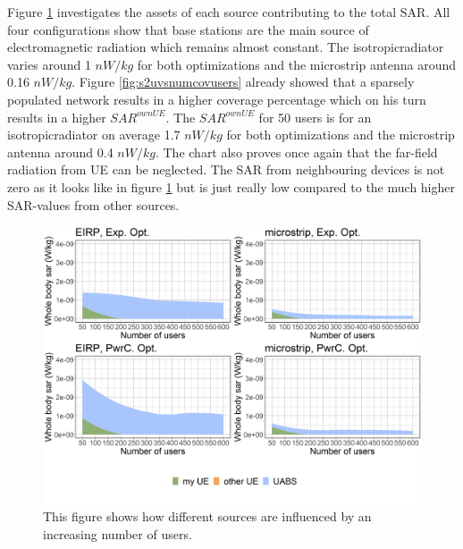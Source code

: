 Figure \ref{fig:s2fourSourcesMatrix} investigates the assets of each source contributing to the total \gls{SAR}. All four 
configurations show that base stations are the main source of electromagnetic radiation which remains almost constant.
The \gls{isotropicradiator} varies around 1 $nW/kg$ for both optimizations and the microstrip antenna around 0.16 $nW/kg$.
Figure \ref{fig:s2uvsnumcovusers} already 
showed that a sparsely populated network results in a higher coverage percentage which on his turn results in a higher $SAR^{ownUE}$. 
The  $SAR^{ownUE}$ for 50 users is for an \gls{isotropicradiator} on average 1.7 $nW/kg$ for both optimizations and the microstrip antenna around 0.4 $nW/kg$.
The chart also proves once again that the far-field radiation from \gls{UE} can be neglected. The \gls{SAR} from 
neighbouring devices is not zero as it looks like in figure \ref{fig:s2fourSourcesMatrix} but is just really low compared to the much higher
\gls{SAR}-values from other sources.
\begin{figure}[h!]
\centering
  \includegraphics[width=\textwidth]{../results/s2/uFourSources.png}
  \caption{This figure shows how different sources are influenced by an increasing number of users. }
  \label{fig:s2fourSourcesMatrix}
\end{figure}

